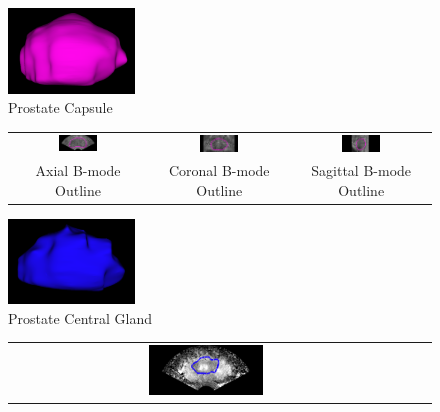\begin{figure}[htb!]
\centering
\includegraphics[width=0.3\textwidth]{zach/Cap_Modeling_Images/3D_Capsule.png} \\
Prostate Capsule \\
\begin{tabular}{ccc}
\includegraphics[width=0.3\textwidth]{zach/Cap_Modeling_Images/Axial_Cap.png} &
\includegraphics[width=0.3\textwidth]{zach/Cap_Modeling_Images/Coronal_Cap.png} &
\includegraphics[width=0.3\textwidth]{zach/Cap_Modeling_Images/Sagittal_Cap.png} \\
Axial B-mode Outline & Coronal B-mode Outline & Sagittal B-mode Outline \\
\end{tabular}
\includegraphics[width=0.3\textwidth]{zach/CG_Modeling_Images/3D_CG.png} \\
Prostate Central Gland \\
\begin{tabular}{ccc}
\includegraphics[width=0.3\textwidth]{zach/CG_Modeling_Images/Axial_CG.png} &

\end{tabular}
\end{figure}
